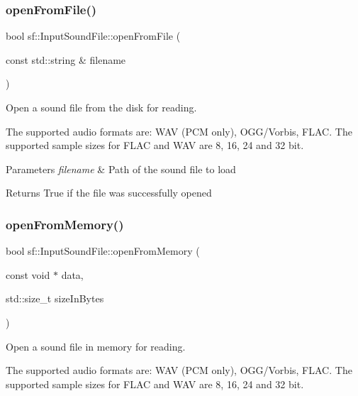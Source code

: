 \subsubsection{\texorpdfstring{openFromFile()}{openFromFile()}}
{\footnotesize\ttfamily bool sf\+::\+Input\+Sound\+File\+::open\+From\+File (\begin{DoxyParamCaption}\item[{const std\+::string \&}]{filename }\end{DoxyParamCaption})}



Open a sound file from the disk for reading. 

The supported audio formats are\+: W\+AV (P\+CM only), O\+G\+G/\+Vorbis, F\+L\+AC. The supported sample sizes for F\+L\+AC and W\+AV are 8, 16, 24 and 32 bit.


\begin{DoxyParams}{Parameters}
{\em filename} & Path of the sound file to load\\
\hline
\end{DoxyParams}
\begin{DoxyReturn}{Returns}
True if the file was successfully opened \begin{DoxyVerb}\end{DoxyVerb}
 
\end{DoxyReturn}
\mbox{\label{classsf_1_1_input_sound_file_a4e034a8e9e69ca3c33a3f11180250400}} 
\subsubsection{\texorpdfstring{openFromMemory()}{openFromMemory()}}
{\footnotesize\ttfamily bool sf\+::\+Input\+Sound\+File\+::open\+From\+Memory (\begin{DoxyParamCaption}\item[{const void $\ast$}]{data,  }\item[{std\+::size\+\_\+t}]{size\+In\+Bytes }\end{DoxyParamCaption})}



Open a sound file in memory for reading. 

The supported audio formats are\+: W\+AV (P\+CM only), O\+G\+G/\+Vorbis, F\+L\+AC. The supported sample sizes for F\+L\+AC and W\+AV are 8, 16, 24 and 32 bit.


